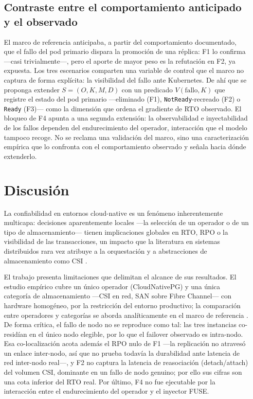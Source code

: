 \documentclass[a4paper]{llncs}
\begin{document}
\subsection{Contraste entre el comportamiento anticipado y el observado}

El marco de referencia \cite{parejo2026} anticipaba, a partir del comportamiento
documentado, que el fallo del pod primario dispara la promoción de una réplica:
F1 lo confirma ---casi trivialmente---, pero el aporte de mayor peso es la
refutación en F2, ya expuesta. Los tres escenarios comparten una variable de
control que el marco no captura de forma explícita: la visibilidad del fallo ante
Kubernetes. De ahí que se proponga extender $S=(O,K,M,D)$ con un predicado
$V(\text{fallo}, K)$ que registre el estado del pod primario ---eliminado (F1),
\texttt{NotReady}-recreado (F2) o \texttt{Ready} (F3)--- como la dimensión que
ordena el gradiente de RTO observado. El bloqueo de F4 apunta a una segunda
extensión: la observabilidad e inyectabilidad de los fallos dependen del
endurecimiento del operador, interacción que el modelo tampoco recoge. No se
reclama una validación del marco, sino una caracterización empírica que lo
confronta con el comportamiento observado y señala hacia dónde extenderlo.

\section{Discusión}
\label{sec:discusion}

La confiabilidad en entornos cloud-native es un fenómeno inherentemente
multicapa: decisiones aparentemente locales ---la selección de un operador o de
un tipo de almacenamiento--- tienen implicaciones globales en RTO, RPO o la
visibilidad de las transacciones, un impacto que la literatura en sistemas
distribuidos rara vez atribuye a la orquestación y a abstracciones de
almacenamiento como CSI \cite{gilbert2002,bailis2013,avizienis2004}.

El trabajo presenta limitaciones que delimitan el alcance de sus resultados. El
estudio empírico cubre un único operador (CloudNativePG) y una única categoría de
almacenamiento ---CSI en red, SAN sobre Fibre Channel--- con hardware homogéneo,
por la restricción del entorno productivo; la comparación entre operadores y
categorías se aborda analíticamente en el marco de referencia \cite{parejo2026}.
De forma crítica, el fallo de nodo no se reproduce como tal: las tres instancias
co-residían en el único nodo elegible, por lo que el failover observado es
intra-nodo. Esa co-localización acota además el RPO nulo de F1 ---la replicación
no atravesó un enlace inter-nodo, así que no prueba todavía la durabilidad ante
latencia de red inter-nodo real---, y F2 no captura la latencia de reasociación
(detach/attach) del volumen CSI, dominante en un fallo de nodo genuino; por ello
sus cifras son una cota inferior del RTO real. Por último, F4 no fue ejecutable
por la interacción entre el endurecimiento del operador y el inyector FUSE.
\end{document}

